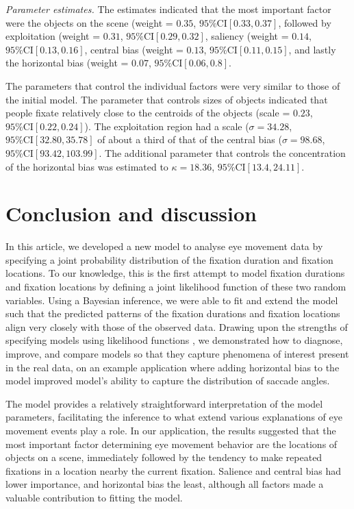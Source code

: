 \documentclass{article}
\begin{document}
\textit{Parameter estimates.} The estimates indicated that the most important factor were the objects on the scene (weight = $0.35$, $95\%\text{CI}[0.33, 0.37]$, followed by exploitation (weight = $0.31$, $95\%\text{CI}[0.29, 0.32]$, saliency (weight = $0.14$, $95\%\text{CI}[0.13, 0.16]$, central bias (weight = $0.13$, $95\%\text{CI}[0.11, 0.15]$, and lastly the horizontal bias (weight = $0.07$, $95\%\text{CI}[0.06, 0.8]$.

The parameters that control the individual factors were very similar to those of the initial model. The parameter that controls sizes of objects indicated that people fixate relatively close to the centroids of the objects (scale = $0.23$, $95\%\text{CI}[0.22, 0.24]$). The exploitation region had a scale ($\sigma = 34.28$, $95\%\text{CI}[32.80, 35.78]$ of about a third of that of the central bias ($\sigma=98.68$, $95\%\text{CI}[93.42, 103.99]$. The additional parameter that controls the concentration of the horizontal bias was estimated to $\kappa = 18.36$, $95\%\text{CI}[13.4,24.11]$.


\section{Conclusion and discussion}

In this article, we developed a new model to analyse eye movement data by specifying a joint probability distribution of the fixation duration and fixation locations. To our knowledge, this is the first attempt to model fixation durations and fixation locations by defining a joint likelihood function of these two random variables. Using a Bayesian inference, we were able to fit and extend the model such that the predicted patterns of the fixation durations and fixation locations align very closely with those of the observed data. Drawing upon the strengths of specifying models using likelihood functions \citep{schutt2017likelihood}, we demonstrated how to diagnose, improve, and compare models so that they capture phenomena of interest present in the real data, on an example application where adding horizontal bias to the model improved model's ability to capture the distribution of saccade angles.

The model provides a relatively straightforward interpretation of the model parameters, facilitating the inference to what extend various explanations of eye movement events play a role. In our application, the results suggested that the most important factor determining eye movement behavior are the locations of objects on a scene, immediately followed by the tendency to make repeated fixations in a location nearby the current fixation. Salience and central bias had lower importance, and horizontal bias the least, although all factors made a valuable contribution to fitting the model.
\end{document}
